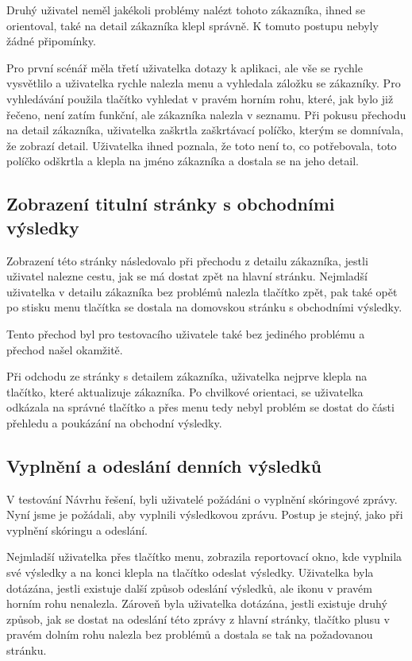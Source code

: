\documentclass[11pt,twoside,a4paper]{book}
\begin{document}
Druhý uživatel neměl jakékoli problémy nalézt tohoto zákazníka, ihned se orientoval, také na detail zákazníka klepl správně. K tomuto postupu nebyly žádné připomínky.

Pro první scénář měla třetí uživatelka dotazy k aplikaci, ale vše se rychle vysvětlilo a uživatelka rychle nalezla menu a vyhledala záložku se zákazníky. Pro vyhledávání použila tlačítko vyhledat v pravém horním rohu, které, jak bylo již řečeno, není zatím funkční, ale zákazníka nalezla v seznamu. Při pokusu přechodu na detail zákazníka, uživatelka zaškrtla zaškrtávací políčko, kterým se domnívala, že zobrazí detail. Uživatelka ihned poznala, že toto není to, co potřebovala, toto políčko odškrtla a klepla na jméno zákazníka a dostala se na jeho detail.

\subsection{Zobrazení titulní stránky s obchodními výsledky}
Zobrazení této stránky následovalo při přechodu z detailu zákazníka, jestli uživatel nalezne cestu, jak se má dostat zpět na hlavní stránku. Nejmladší uživatelka v detailu zákazníka bez problémů nalezla tlačítko zpět, pak také opět po stisku menu tlačítka se dostala na domovskou stránku s obchodními výsledky.

Tento přechod byl pro testovacího uživatele také bez jediného problému a přechod našel okamžitě.

Při odchodu ze stránky s detailem zákazníka, uživatelka nejprve klepla na tlačítko, které aktualizuje zákazníka. Po chvilkové orientaci, se uživatelka odkázala na správné tlačítko a přes menu tedy nebyl problém se dostat do části přehledu a poukázání na obchodní výsledky.

\subsection{Vyplnění a odeslání denních výsledků}
V testování Návrhu řešení, byli uživatelé požádáni o vyplnění skóringové zprávy. Nyní jsme je požádali, aby vyplnili výsledkovou zprávu. Postup je stejný, jako při vyplnění skóringu a odeslání. 

Nejmladší uživatelka přes tlačítko menu, zobrazila reportovací okno, kde vyplnila své výsledky a na konci klepla na tlačítko odeslat výsledky. Uživatelka byla dotázána, jestli existuje další způsob odeslání výsledků, ale ikonu v pravém horním rohu nenalezla. Zároveň byla uživatelka dotázána, jestli existuje druhý způsob, jak se dostat na odeslání této zprávy z hlavní stránky, tlačítko plusu v pravém dolním rohu nalezla bez problémů a dostala se tak na požadovanou stránku.
\end{document}

